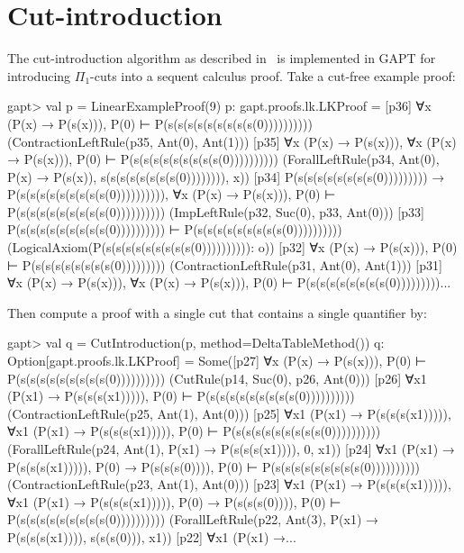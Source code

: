 \documentclass[a4paper,11pt]{book}
\begin{document}
\section{Cut-introduction}\label{sec.cut-introduction}

The cut-introduction algorithm as described in~\cite{Hetzl2012,Hetzl14Algorithmic,Hetzl14Introducing} is
implemented in GAPT for introducing $\Pi_1$-cuts into a sequent calculus
proof. Take a cut-free example proof:
\begin{clilisting}
gapt> val p = LinearExampleProof(9)
p: gapt.proofs.lk.LKProof =
[p36] ∀x (P(x) → P(s(x))), P(0) ⊢ P(s(s(s(s(s(s(s(s(s(0))))))))))    (ContractionLeftRule(p35, Ant(0), Ant(1)))
[p35] ∀x (P(x) → P(s(x))), ∀x (P(x) → P(s(x))), P(0) ⊢ P(s(s(s(s(s(s(s(s(s(0))))))))))    (ForallLeftRule(p34, Ant(0), P(x) → P(s(x)), s(s(s(s(s(s(s(s(0)))))))), x))
[p34] P(s(s(s(s(s(s(s(s(0))))))))) → P(s(s(s(s(s(s(s(s(s(0)))))))))),
∀x (P(x) → P(s(x))),
P(0)
⊢
P(s(s(s(s(s(s(s(s(s(0))))))))))    (ImpLeftRule(p32, Suc(0), p33, Ant(0)))
[p33] P(s(s(s(s(s(s(s(s(s(0)))))))))) ⊢ P(s(s(s(s(s(s(s(s(s(0))))))))))    (LogicalAxiom(P(s(s(s(s(s(s(s(s(s(0)))))))))): o))
[p32] ∀x (P(x) → P(s(x))), P(0) ⊢ P(s(s(s(s(s(s(s(s(0)))))))))    (ContractionLeftRule(p31, Ant(0), Ant(1)))
[p31] ∀x (P(x) → P(s(x))), ∀x (P(x) → P(s(x))), P(0) ⊢ P(s(s(s(s(s(s(s(s(0)))))))))...

\end{clilisting}
Then compute a proof with a single cut that contains a single quantifier by:
\begin{clilisting}
gapt> val q = CutIntroduction(p, method=DeltaTableMethod())
q: Option[gapt.proofs.lk.LKProof] =
Some([p27] ∀x (P(x) → P(s(x))), P(0) ⊢ P(s(s(s(s(s(s(s(s(s(0))))))))))    (CutRule(p14, Suc(0), p26, Ant(0)))
[p26] ∀x1 (P(x1) → P(s(s(s(x1))))), P(0) ⊢ P(s(s(s(s(s(s(s(s(s(0))))))))))    (ContractionLeftRule(p25, Ant(1), Ant(0)))
[p25] ∀x1 (P(x1) → P(s(s(s(x1))))),
∀x1 (P(x1) → P(s(s(s(x1))))),
P(0)
⊢
P(s(s(s(s(s(s(s(s(s(0))))))))))    (ForallLeftRule(p24, Ant(1), P(x1) → P(s(s(s(x1)))), 0, x1))
[p24] ∀x1 (P(x1) → P(s(s(s(x1))))),
P(0) → P(s(s(s(0)))),
P(0)
⊢
P(s(s(s(s(s(s(s(s(s(0))))))))))    (ContractionLeftRule(p23, Ant(1), Ant(0)))
[p23] ∀x1 (P(x1) → P(s(s(s(x1))))),
∀x1 (P(x1) → P(s(s(s(x1))))),
P(0) → P(s(s(s(0)))),
P(0)
⊢
P(s(s(s(s(s(s(s(s(s(0))))))))))    (ForallLeftRule(p22, Ant(3), P(x1) → P(s(s(s(x1)))), s(s(s(0))), x1))
[p22] ∀x1 (P(x1) →...

\end{clilisting}
\end{document}
